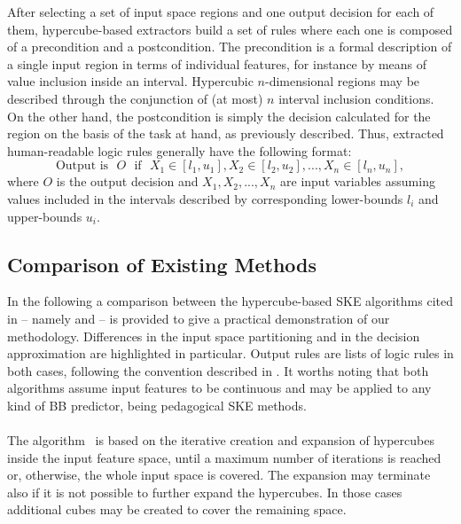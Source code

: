 \documentclass[
]{ceurart}
\begin{document}
After selecting a set of input space regions and one output decision for each of them, hypercube-based extractors build a set of rules where each one is composed of a precondition and a postcondition.
%
The precondition is a formal description of a single input region in terms of individual features, for instance by means of value inclusion inside an interval.
%
Hypercubic $n$-dimensional regions may be described through the conjunction of (at most) $n$ interval inclusion conditions.
%
On the other hand, the postcondition is simply the decision calculated for the region on the basis of the task at hand, as previously described.
%
Thus, extracted human-readable logic rules generally have the following format:
%
\begin{equation*}
	\text{Output is ~} O \text{~ if ~} X_1 \in [l_1, u_1], X_2 \in [l_2, u_2], ..., X_n \in [l_n, u_n],
\end{equation*}
%
where $O$ is the output decision and $X_1, X_2, ..., X_n$ are input variables assuming values included in the intervals described by corresponding lower-bounds $l_i$ and upper-bounds $u_i$.

\subsection{Comparison of Existing Methods}

In the following a comparison between the hypercube-based SKE algorithms cited in  -- namely \iter{} and \gridex{} -- is provided to give a practical demonstration of our methodology.
%
Differences in the input space partitioning and in the decision approximation are highlighted in particular.
%
Output rules are lists of logic rules in both cases, following the convention described in .
%
It worths noting that both algorithms assume input features to be continuous and may be applied to any kind of BB predictor, being pedagogical SKE methods.

\paragraph{\iter}

The \iter{} algorithm~\cite{huysmans2006iter} is based on the iterative creation and expansion of hypercubes inside the input feature space, until a maximum number of iterations is reached or, otherwise, the whole input space is covered.
%
The expansion may terminate also if it is not possible to further expand the hypercubes.
%
In those cases additional cubes may be created to cover the remaining space.
\end{document}
